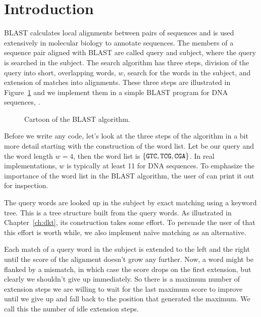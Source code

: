\nwfilename{}\nwenddocs{}\nwdocspar%
\section*{Introduction}
BLAST calculates local alignments between pairs of sequences and is
used extensively in molecular biology to annotate sequences. The
members of a sequence pair aligned with BLAST are called query and
subject, where the query is searched in the subject. The search
algorithm has three steps, division of the query into short,
overlapping words, $w$, search for the words in the subject, and
extension of matches into alignments. These three steps are
illustrated in Figure~\ref{fig:blast} and we implement them in a
simple BLAST program for DNA sequences, .

\begin{figure}
  \begin{center}
    
  \end{center}
  \caption{Cartoon of the BLAST algorithm.}\label{fig:blast}
\end{figure}

Before we write any code, let's look at the three steps of the
algorithm in a bit more detail starting with the construction of the
word list. Let  be our query and the word length $w=4$, then
the word list is $\{\texttt{GTC}, \texttt{TCG}, \texttt{CGA}\}$. In real
implementations, $w$ is typically at least 11 for DNA sequences. To
emphasize the importance of the word list in the BLAST algorithm, the
user of  can print it out for inspection.

The query words are looked up in the subject by exact matching using a
keyword tree. This is a tree structure built from the query words. As
illustrated in Chapter~\ref{ch:dkt}, its construction takes some
effort. To persuade the user of  that this effort is worth
while, we also implement na\"ive matching as an alternative.

Each match of a query word in the subject is extended to the left and
the right until the score of the alignment doesn't grow any
further. Now, a word might be flanked by a mismatch, in which case the
score drops on the first extension, but clearly we shouldn't give up
immediately. So there is a maximum number of extension steps we are
willing to wait for the last maximum score to improve until we give up
and fall back to the position that generated the maximum. We call this
the number of idle extension steps.


